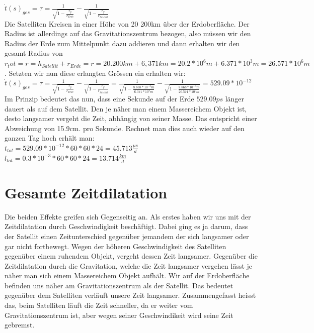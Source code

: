 \begin{refsection}
\( \dot t(s)_ {ges} = \tau = \frac{1}{\sqrt{1-\frac{r_g}{r_{Erde}}}} - \frac{1}{\sqrt{1-\frac{r_g}{r_{Satellit}}}} \) \\

Die Satelliten Kreisen in einer Höhe von 20 200km über der Erdoberfläche. Der Radius ist allerdings auf das Gravitationszentrum bezogen, also müssen wir den Radius der Erde zum Mittelpunkt dazu addieren und dann erhalten wir den gesamt Radius von \( r_tot = r = h_{Satellit} + r_{Erde} = r = 20.200 km + 6,371 km = 20.2 * 10^6m + 6.371 * 10^3m = 26.571 * 10^6m \). Setzten wir nun diese erlangten Grössen ein erhalten wir:\\

\( \dot t(s)_ {ges} = \tau = \frac{1}{\sqrt{1-\frac{r_g}{r_{Erde}}}} - \frac{1}{\sqrt{1-\frac{r_g}{r_{Satellit}}}} =  
\frac{1}{\sqrt{1-\frac{8.868 * 10^{-3}m}{ 6.371 * 10^3m}}} - \frac{1}{\sqrt{1-\frac{8.868 * 10^{-3}m}{ 26.571 * 10^6m}}} =  529.09 * 10^{-12} \) \\

Im Prinzip bedeutet das nun, dass eine Sekunde auf der Erde \( 529.09ps \) länger dauert als auf dem Satellit. Den je näher man einem Massereichem Objekt ist, desto langsamer vergeht die Zeit, abhängig von seiner Masse. Das entspricht einer Abweichung von 15.9cm. pro Sekunde. Rechnet man dies auch wieder auf den ganzen Tag hoch erhält man: \\

\( t_{tot} = 529.09 * 10^{-12} * 60 * 60 * 24 = 45.713\frac{\mu{}s}{d} \) \\

\( l_{tot} = 0.3 * 10^{-3} * 60 * 60 * 24 = 13.714\frac{km}{d} \) \\

\section{Gesamte Zeitdilatation}
Die beiden Effekte greifen sich Gegenseitig an. Als erstes haben wir uns mit der Zeitdilatation durch Geschwindigkeit beschäftigt. Dabei ging es ja darum, dass der Satellit einen Zeitunterschied gegenüber jemandem der sich langsamer oder gar nicht fortbewegt. Wegen der höheren Geschwindigkeit des Satelliten gegenüber einem ruhendem Objekt, vergeht dessen Zeit langsamer. Gegenüber die Zeitdilatation durch die Gravitation, welche die Zeit langsamer vergehen lässt je näher man sich einem Massereichem Objekt aufhält. Wir auf der Erdoberfläche befinden uns näher am Gravitationszentrum als der Satellit. Das bedeutet gegenüber dem Satelliten verläuft unsere Zeit langsamer. Zusammengefasst heisst das, beim Satelliten läuft die Zeit schneller, da er weiter vom Gravitationszentrum ist, aber wegen seiner Geschwindikeit wird seine Zeit gebremst.


\end{refsection}
